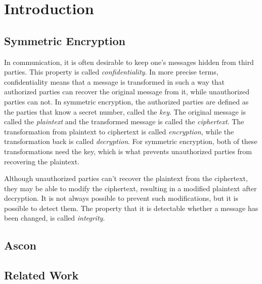 \section{Introduction}

\subsection{Symmetric Encryption}

In communication, it is often desirable to keep one's messages hidden from third
parties. This property is called \emph{confidentiality}. In more precise terms,
confidentiality means that a message is transformed in such a way that
authorized parties can recover the original message from it, while unauthorized
parties can not. In symmetric encryption, the authorized parties are defined as
the parties that know a secret number, called the \emph{key}. The original
message is called the \emph{plaintext} and the transformed message is called the
\emph{ciphertext}. The transformation from plaintext to ciphertext is called
\emph{encryption}, while the transformation back is called \emph{decryption}.
For symmetric encryption, both of these transformations need the key, which is
what prevents unauthorized parties from recovering the plaintext.

Although unauthorized parties can't recover the plaintext from the ciphertext,
they may be able to modify the ciphertext, resulting in a modified plaintext
after decryption. It is not always possible to prevent such modifications, but
it is possible to detect them. The property that it is detectable whether a
message has been changed, is called \emph{integrity}.

\subsection{Ascon}

\subsection{Related Work}
